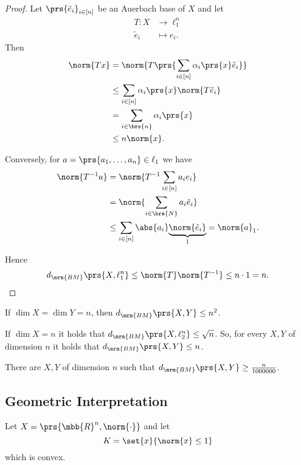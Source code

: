 \documentclass[10pt, twoside]{book}
\begin{document}
\begin{proof}
Let $\prs{\tilde{e}_i}_{i \in [n]}$ be an Auerbach base of $X$ and let
\begin{align*}
T \colon X &\to \ell_1^n \\
\tilde{e}_i &\mapsto e_i \text{.}
\end{align*}
Then
\begin{align*}
\norm{Tx} &= \norm{T \prs{\sum_{i \in [n]} \alpha_i \prs{x} \tilde{e}_i}}
\\&\leq \sum_{i\in[n]} \alpha_i \prs{x} \norm{T \tilde{e}_i}
\\&=
\sum_{i \in \brs{n}} \alpha_i \prs{x}
\\&\leq
n\norm{x} \text{.}
\end{align*}

Conversely, for $a = \prs{a_1, \ldots, a_n} \in \ell_1$ we have
\begin{align*}
\norm{T^{-1} a}
&=
\norm{T^{-1} \sum_{i \in [n]} a_i e_i}
\\&=
\norm{\sum_{i \in \brs{N}} a_i \tilde{e}_i}
\\&\leq
\sum_{i \in [n]} \abs{a_i} \underset{1}{\underbrace{\norm{\tilde{e}_i}}} = \norm{a}_1 \text{.}
\end{align*}

Hence \[d_{\mrm{BM}}\prs{X, \ell_1^n} \leq \norm{T} \norm{T^{-1}} \leq n \cdot 1 = n \text{.}\]
\end{proof}

\begin{corollary}
If $\dim X = \dim Y = n$, then $d_{\mrm{BM}}\prs{X,Y} \leq n^2$.
\end{corollary}

\begin{fact}[F. John]
If $\dim X = n$ it holds that $d_{\mrm{BM}}\prs{X, \ell_2^n} \leq \sqrt{n}$. So, for every $X,Y$ of dimension $n$ it holds that $d_{\mrm{BM}}\prs{X,Y} \leq n$.
\end{fact}

\begin{fact}[Gluskin]
There are $X,Y$ of dimension $n$ such that $d_{\mrm{BM}}\prs{X,Y} \geq \frac{n}{1000000}$.
\end{fact}

\subsection{Geometric Interpretation}

Let $X = \prs{\mbb{R}^n, \norm{\cdot}}$ and let
\[K = \set{x}{\norm{x} \leq 1}\]
which is convex.
\end{document}
